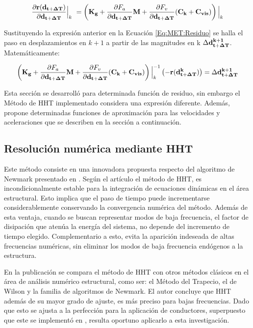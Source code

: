 \begin{equation}\label{Eq:PRE:DerivadaResiduo}
	\frac{\partial  \bf{r}(\bf{d}_{t+\Delta T})}{\partial \bf{d}_{t+\Delta T}}\Big|_k~
	= \left (\bf{K}_g+\frac{\partial\text{$ F_a$}}{\partial \bf{{d}}_{t+\Delta T}}\bf{M} + \frac{\partial\text{$ F_v$}}{\partial \bf{{d}}_{t+\Delta T}}(\bf{C}_k+\bf{C}_{vis}) \right)\Big|_k
\end{equation}

Sustituyendo la expresión anterior en la Ecuación \eqref{Eq:MET:Residuo} se halla el paso en desplazamientos en $k+1$ a partir de las magnitudes en k $\Delta \bf{d}^{k+1}_{t+\Delta T}$. Matemáticamente:

\begin{equation}\label{Eq:Pre:Incremento}
	\left (\bf{K}_g+\frac{\partial\text{$ F_a$}}{\partial \bf{{d}}_{t+\Delta T}}\bf{M} + \frac{\partial\text{$ F_v$}}{\partial \bf{{d}}_{t+\Delta T}}(\bf{C}_k+\bf{C}_{vis} )  \right)\Big|_k^{-1} \left(-\bf{r}(\bf{d}^k_{t+\Delta T})\right)=  \Delta\bf{d}^{k+1}_{t+\Delta T}
\end{equation}

Esta sección se desarrolló para determinada función de residuo, sin embargo el Método de HHT implementado considera una expresión diferente. Además, propone determinadas funciones de aproximación para las velocidades y aceleraciones que se describen en la sección a continuación. 


\subsection{Resolución numérica mediante HHT}\label{Sec:MET:HHT}
Este método consiste en una innovadora propuesta respecto del algoritmo de Newmark presentado en \citep{newmark1959method}. Según el artículo \citep{hilber1977improved} el método de HHT, es incondicionalmente estable para la integración de ecuaciones dinámicas en el área estructural. Esto implica que el paso de tiempo puede incrementarse considerablemente conservando la convergencia numérica del método. Además de esta ventaja, cuando se buscan representar modos de baja frecuencia, el factor de disipación que atenúa la energía del sistema, no depende del incremento de tiempo elegido. Complementario a esto, evita la aparición indeseada de altas frecuencias numéricas, sin eliminar los modos de baja frecuencia endógenos a la estructura. 

En la publicación \citep{hilber1977improved} se compara el método de HHT con otros métodos clásicos en el área de análisis numérico estructural, como ser: el Método del Trapecio, el de Wilson y la familia de algoritmos de Newmark. El autor concluye que HHT además de su mayor grado de ajuste, es más preciso para bajas frecuencias. Dado que esto se ajusta a la perfección para la aplicación de conductores, superpuesto que este se implementó en \citep{Le2014}, resulta oportuno aplicarlo a esta investigación.

